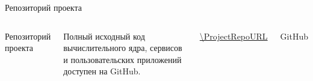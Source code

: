 \begin{frame}[plain]{Репозиторий проекта}
  \vspace{0.8cm}
  \begin{columns}[T,onlytextwidth]
      \Huge Репозиторий проекта

      \vspace{0.8cm}
      \normalsize
      Полный исходный код вычислительного ядра, сервисов и пользовательских приложений доступен на GitHub.

      \vspace{0.5cm}
      \url{\ProjectRepoURL}

      \centering
      \qrcode[height=4.2cm]{\ProjectRepoURL}

      \vspace{0.4cm}
      \small GitHub
  \end{columns}
\end{frame}


